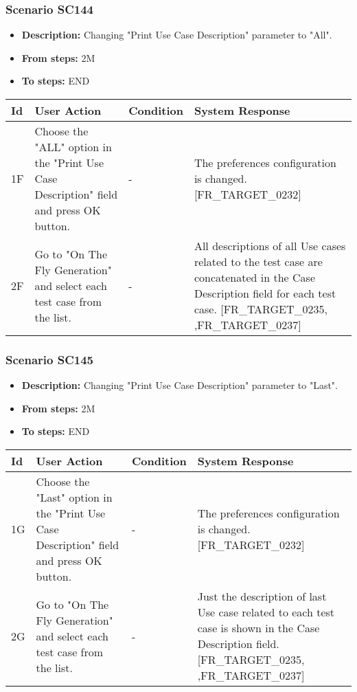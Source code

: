 \documentclass[a4paper,11pt]{article}
\newcommand{\bl}{\\ \hline}
\begin{document}
\subsubsection*{Scenario SC144}
\begin{itemize}
\item {\bf Description:} Changing "Print Use Case Description" parameter to
					"All".
\item {\bf From steps:} 2M
\item {\bf To steps:} END
\end{itemize}
\begin{tabular}{|p{0.4in}|p{1.5in}|p{1.5in}|p{1.5in}|}
\hline
Id & User Action & Condition & System Response \bl 
1F & Choose the "ALL" option in the "Print Use Case Description"
						field and press OK button. & - & The preferences configuration is changed.
						[FR_TARGET_0232]\bl
2F & Go to "On The Fly Generation" and select each test case
						from the list. & - & All descriptions of all Use cases related to the test
						case are concatenated in the Case Description field for each test
						case. [FR_TARGET_0235, ,FR_TARGET_0237]\bl
\end{tabular}
\subsubsection*{Scenario SC145}
\begin{itemize}
\item {\bf Description:} Changing "Print Use Case Description" parameter to
					"Last".
\item {\bf From steps:} 2M
\item {\bf To steps:} END
\end{itemize}
\begin{tabular}{|p{0.4in}|p{1.5in}|p{1.5in}|p{1.5in}|}
\hline
Id & User Action & Condition & System Response \bl 
1G & Choose the "Last" option in the "Print Use Case
						Description" field and press OK button. & - & The preferences configuration is changed.
						[FR_TARGET_0232]\bl
2G & Go to "On The Fly Generation" and select each test case
						from the list. & - & Just the description of last Use case related to each
						test case is shown in the Case Description field. [FR_TARGET_0235,
						,FR_TARGET_0237]\bl
\end{tabular}
\end{document}
